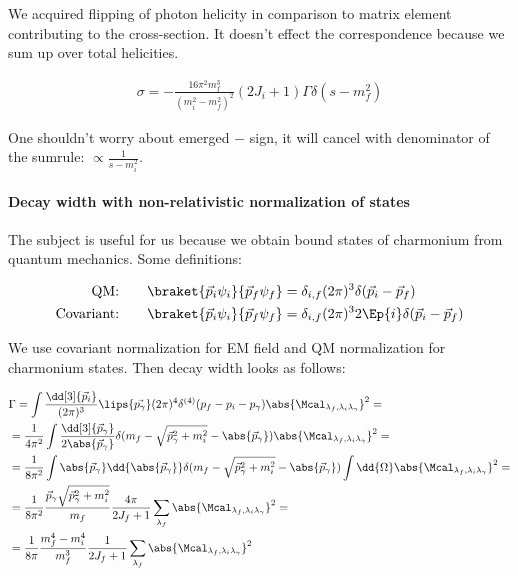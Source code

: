 We acquired flipping of photon helicity in comparison to matrix element contributing to the cross-section. It doesn't effect the correspondence because we sum up over total helicities.

\begin{align} \label{eq:app:crsc-dw-subthr}
    \sigma = -\frac{16 \pi^2 m_f^3}{(m_i^2 - m_f^2)^2} (2J_i + 1) \Gamma \delta(s - m_f^2)
\end{align}

One shouldn't worry about emerged $-$ sign, it will cancel with denominator of the sumrule: $\propto \frac{1}{s - m_i^2}$.

\paragraph{Decay width with non-relativistic normalization of states} \label{par:app:dw-nr}
The subject is useful for us because we obtain bound states of charmonium from quantum mechanics. Some definitions:

\begin{align}
    \text{QM:}\qquad &\braket{\vec{p}_i \psi_i}{\vec{p}_f \psi_f} = \delta_{i, f} (2\pi)^3 \delta(\vec{p}_i - \vec{p}_f) \\
    \text{Covariant:}\qquad &\braket{\vec{p}_i \psi_i}{\vec{p}_f \psi_f} = \delta_{i, f} (2\pi)^3 2 \Ep{i} \delta(\vec{p}_i - \vec{p}_f)
\end{align}

We use covariant normalization for EM field and QM normalization for charmonium states. Then decay width looks as follows:

\begin{align}
    &\Gamma = \int \frac{\dd[3]{\vec{p}_i}}{(2\pi)^3} \lips{\vec{p_\gamma}}  (2\pi)^4 \delta^{(4)}(p_f - p_i - p_\gamma) \abs{\Mcal_{\lambda_f, \lambda_i \lambda_\gamma}}^2 = \\
    &= \frac{1}{4 \pi^2} \int \frac{\dd[3]{\vec{p}_\gamma}}{2 \abs{\vec{p}_\gamma}} \delta(m_f - \sqrt{\vec{p}_\gamma^2 + m_i^2} - \abs{\vec{p}_\gamma}) \abs{\Mcal_{\lambda_f, \lambda_i \lambda_\gamma}}^2 = \\
    &= \frac{1}{8\pi^2} \int \abs{\vec{p}_\gamma} \dd{\abs{\vec{p}_\gamma}} \delta(m_f - \sqrt{\vec{p}_\gamma^2 + m_i^2} - \abs{\vec{p}_\gamma}) \int \dd{\Omega}\abs{\Mcal_{\lambda_f, \lambda_i \lambda_\gamma}}^2 = \\
    &= \frac{1}{8 \pi^2} \frac{\vec{p}_\gamma \sqrt{\vec{p}_\gamma^2 + m_i^2}}{m_f} \frac{4 \pi}{2J_f + 1} \sum_{\lambda_f} \abs{\Mcal_{\lambda_f, \lambda_i \lambda_\gamma}}^2 = \\
    &= \frac{1}{8 \pi} \frac{m_f^4 - m_i^4}{m_f^3} \frac{1}{2J_f + 1} \sum_{\lambda_f} \abs{\Mcal_{\lambda_f, \lambda_i \lambda_\gamma}}^2
\end{align}
